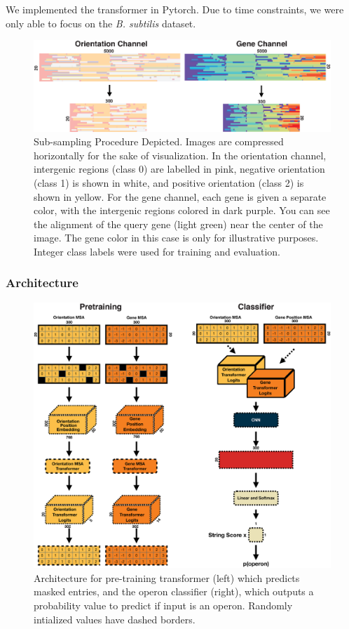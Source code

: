 \documentclass{article}
\begin{document}
We implemented the transformer in Pytorch. Due to time constraints, we were only able to focus on the \textit{B. subtilis} dataset.

\begin{figure} [h]
  \centering
  \includegraphics[width=.75\textwidth]{images/Subsampling.eps}
  \caption{Sub-sampling Procedure Depicted. Images are compressed horizontally for the sake of visualization. In the orientation channel, intergenic regions (class 0) are labelled in pink, negative orientation (class 1) is shown in white, and positive orientation (class 2) is shown in yellow. For the gene channel, each gene is given a separate color, with the intergenic regions colored in dark purple. You can see the alignment of the query gene (light green) near the center of the image. The gene color in this case is only for illustrative purposes. Integer class labels were used for training and evaluation.}
  \label{fig:subsampling}
\end{figure}

\subsubsection{Architecture}

\begin{figure} [h]
  \centering
  \includegraphics[width=.75\textwidth]{images/Model Diagram.eps}
  \caption{Architecture for pre-training transformer (left) which predicts masked entries, and the operon classifier (right), which outputs a probability value to predict if input is an operon. Randomly intialized values have dashed borders.}
  \label{fig:architecture}
\end{figure}
\end{document}
